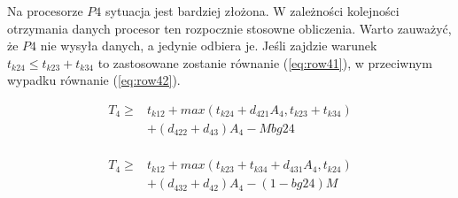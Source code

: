 Na procesorze $P4$ sytuacja jest bardziej złożona. W zależności kolejności otrzymania danych procesor ten rozpocznie stosowne obliczenia.
Warto zauważyć, że $P4$ nie wysyła danych, a jedynie odbiera je.
Jeśli zajdzie warunek $t_{k24} \leq t_{k23} + t_{k34}$ to zastosowane zostanie równanie (\ref{eq:row41}), w przeciwnym wypadku równanie (\ref{eq:row42}).

\begin{equation} \label{eq:row41}
\begin{array}{rl}
T_{4} \geq &t_{k12} + max(t_{k24} + d_{421}A_{4}, t_{k23} + t_{k34}) \\
&+ (d_{422} + d_{43})A_{4} - Mbg24 \\
\end{array}
\end{equation}

\begin{equation} \label{eq:row42}
\begin{array}{rl}
T_{4} \geq &t_{k12} + max(t_{k23} + t_{k34} + d_{431}A_{4}, t_{k24}) \\
&+ (d_{432} + d_{42})A_{4} - (1-bg24)M
\end{array}
\end{equation}

\newpage
